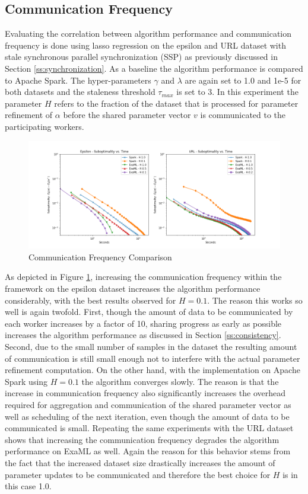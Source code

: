\subsection{Communication Frequency}
Evaluating the correlation between algorithm performance and communication frequency is done using lasso regression on the epsilon and URL dataset with stale synchronous parallel synchronization (SSP) as previously discussed in Section \ref{ss:synchronization}.
As a baseline the algorithm performance is compared to Apache Spark.
The hyper-parameters $\gamma$ and $\lambda$ are again set to 1.0 and 1e-5 for both datasets and the staleness threshold $\tau_{max}$ is set to 3.
In this experiment the parameter $H$ refers to the fraction of the dataset that is processed for parameter refinement of $\alpha$ before the shared parameter vector $v$ is communicated to the participating workers.
\begin{figure}[ht]
\centering
\includegraphics[width=1.0\textwidth]{img/comm_freq_cmp.png}
\caption{Communication Frequency Comparison}
\label{fig:comm_freq_cmp}
\end{figure}
As depicted in Figure \ref{fig:comm_freq_cmp}, increasing the communication frequency within the framework on the epsilon dataset increases the algorithm performance considerably, with the best results observed for $H = 0.1$.
The reason this works so well is again twofold.
First, though the amount of data to be communicated by each worker increases by a factor of 10, sharing progress as early as possible increases the algorithm performance as discussed in Section \ref{ss:consistency}.
Second, due to the small number of samples in the dataset the resulting amount of communication is still small enough not to interfere with the actual parameter refinement computation.
On the other hand, with the implementation on Apache Spark using $H=0.1$ the algorithm converges slowly.
The reason is that the increase in communication frequency also significantly increases the overhead required for aggregation and communication of the shared parameter vector as well as scheduling of the next iteration, even though the amount of data to be communicated is small.
Repeating the same experiments with the URL dataset shows that increasing the communication frequency degrades the algorithm performance on ExaML as well.
Again the reason for this behavior stems from the fact that the increased dataset size drastically increases the amount of parameter updates to be communicated and therefore the best choice for $H$ is in this case 1.0.

